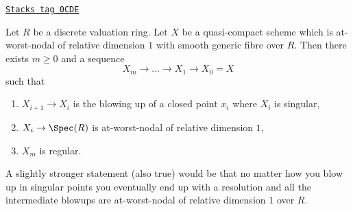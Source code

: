 \begin{lemma}
\label{models-lemma-blowup-at-worst-nodal}
\href{https://stacks.math.columbia.edu/tag/0CDE}{\texttt{Stacks tag 0CDE}}

Let $R$ be a discrete valuation ring. Let $X$ be a quasi-compact scheme which
is at-worst-nodal of relative dimension $1$ with smooth generic fibre over $R$.
Then there exists $m \geq 0$ and a sequence
$$
X_m \to \ldots \to X_1 \to X_0 = X
$$
such that
\begin{enumerate}
\item $X_{i + 1} \to X_i$ is the blowing up of a closed point
$x_i$ where $X_i$ is singular,
\item $X_i \to \Spec(R)$ is at-worst-nodal of relative dimension $1$,
\item $X_m$ is regular.
\end{enumerate}
\end{lemma}

A slightly stronger statement (also true) would be that no matter how
you blow up in singular points you eventually end up with a resolution
and all the intermediate blowups are
at-worst-nodal of relative dimension $1$ over $R$.

